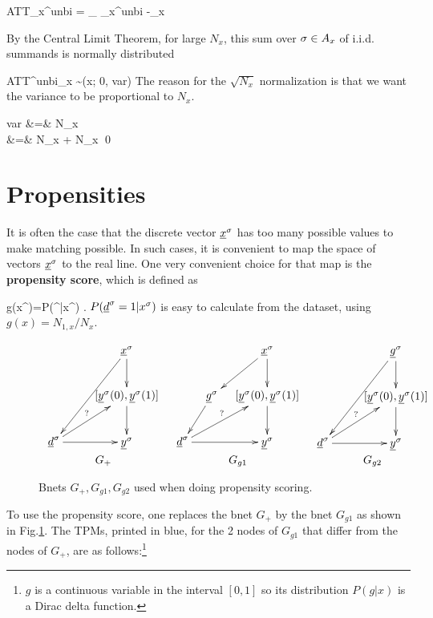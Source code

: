 \beq
{ATT_x}^{unbi}
=
_{
_x^{unbi}}
-\cale_x
\eeq

By the Central
Limit Theorem,
for large $N_x$,
this sum over $\sigma\in A_x$
of i.i.d. summands
is normally
distributed

\beq
{}
{ATT}^{unbi}_x
\sim \caln(x; 0, var)
\eeq
The reason for
the $\sqrt{N_x}$
normalization
is that we want the variance
to be proportional
to $N_x$.

\beqa
var &=& N_x
\\
&=&
N_x
+
N_x
\eeqa
\qed



\section{Propensities}\label{sec-propensities}

It is often the case
that the discrete vector $\rvx^\s$
has
too many possible values to make
matching possible.
In such cases, it
is convenient to
map the space
of vectors
$\rvx^\s$
to the real line.
One very
convenient choice
for that map
is the
{\bf propensity score},
which is defined as

\beq
g(x^\s)=P(\rvd^|x^\s)
\;.
\eeq
$P(\rvd^\s=1|x^\s)$ is easy to calculate
from the dataset, using $g(x)=N_{1,x}/N_x$.

\begin{figure}[h!]
$$
\begin{array}{ccc}
\xymatrix@C=.8pc{
&&\rvx^\s\ar[ddll]\ar[d]
\\
&&[\rvy^\s(0),\rvy^\s(1)]\ar[d]
\\
\rvd^\s\ar[urr]^?\ar[rr]
&
&\rvy^\s
}
&
\xymatrix@C=.8pc{
&&\rvx^\s\ar[dl]\ar[d]
\\
&\rvg^\s\ar[dl]
&[\rvy^\s(0),\rvy^\s(1)]\ar[d]
\\
\rvd^\s\ar[urr]^?\ar[rr]
&
&\rvy^\s
}
&
\xymatrix@C=.8pc{
&&\rvg^\s\ar[ddll]\ar[d]
\\
&&[\rvy^\s(0),\rvy^\s(1)]\ar[d]
\\
\rvd^\s\ar[urr]^?\ar[rr]
&
&\rvy^\s
}
\\
G_+&G_{g1}&G_{g2}
\end{array}
$$
\caption{Bnets $G_+, G_{g1}, G_{g2}$
used when doing propensity scoring.}
\label{fig-po-G-ps}
\end{figure}
To use the
propensity score,
one replaces the bnet $G_{+}$
by the bnet $G_{g1}$ as
shown in Fig.\ref{fig-po-G-ps}.
The TPMs, printed in blue,
for the 2 nodes of $G_{g1}$
that differ from the nodes
of $G_{+}$,
are as follows:\footnote{$g$ is a continuous variable
in the interval $[0,1]$
so its distribution 
$P(g|x)$ is a Dirac delta function. }


